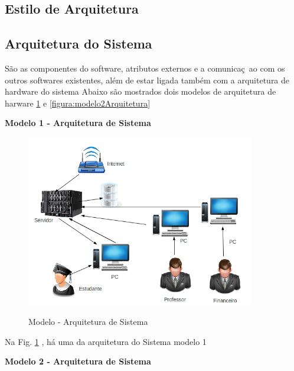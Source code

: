 \subsection{Estilo de Arquitetura}
  \subsection{Arquitetura do Sistema}
  
 
  São as componentes do software, atributos externos e a comunicaç~ao com os outros softwares existentes, além de estar ligada também com a 
  arquitetura de hardware do sistema
  Abaixo são mostrados dois modelos de arquitetura de harware \ref{figura:ArquiteturaDeSoftware} e \ref{figura:modelo2Arquitetura}
  
   \textbf{Modelo 1 - Arquitetura de Sistema }
  
       \begin{figure}[H]
                 \caption{Modelo - Arquitetura de Sistema}
               \centering %
                \includegraphics[width=10cm]{analisedeProjeto/ArquiteturaDeSoftware} %
                \label{figura:ArquiteturaDeSoftware}
                \end{figure}
                Na Fig. \ref{figura:ArquiteturaDeSoftware} , há uma da arquitetura do Sistema modelo 1
                
                
                     \textbf{Modelo 2 - Arquitetura de Sistema }  
                
